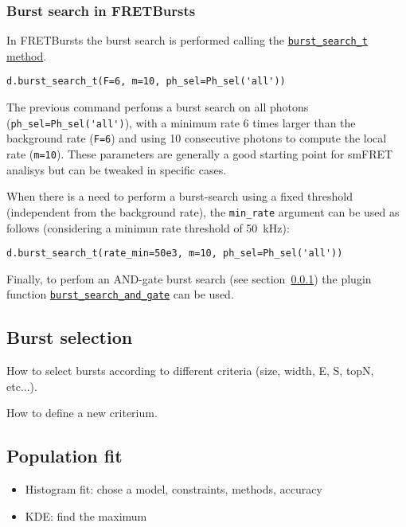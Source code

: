 \subsubsection{Burst search in FRETBursts}
\label{sec:burstsearch-intro}

In FRETBursts the burst search is performed calling the \href{http://fretbursts.readthedocs.org/en/latest/data_class.html#fretbursts.burstlib.Data.burst_search_t}{\verb|burst_search_t| method}.

\begin{verbatim}
d.burst_search_t(F=6, m=10, ph_sel=Ph_sel('all'))
\end{verbatim}

The previous command perfoms a burst search on all photons (\verb|ph_sel=Ph_sel('all')|), with a minimum rate 6 times larger than the background rate (\verb|F=6|) and using 10 consecutive photons to compute the local rate (\verb|m=10|).
These parameters are generally a good starting point for smFRET analisys but can be tweaked in specific cases.

When there is a need to perform a burst-search using a fixed threshold (independent from the background rate), 
the \verb|min_rate| argument can be used as follows (considering a minimun rate threshold of 50~kHz):

\begin{verbatim}
d.burst_search_t(rate_min=50e3, m=10, ph_sel=Ph_sel('all'))
\end{verbatim}

Finally, to perfom an AND-gate burst search (see section~\ref{sec:burstsearch-intro}) the plugin function \href{http://fretbursts.readthedocs.org/en/latest/plugins.html#fretbursts.burstlib_ext.burst_search_and_gate}{\verb|burst_search_and_gate|} can be used.

\subsection{Burst selection}

How to select bursts according to different criteria (size, width, E, S, topN, etc...).

How to define a new criterium.


\subsection{Population fit}

\begin{itemize}
\item Histogram fit: chose a model, constraints, methods, accuracy
\item KDE: find the maximum
\end{itemize}

